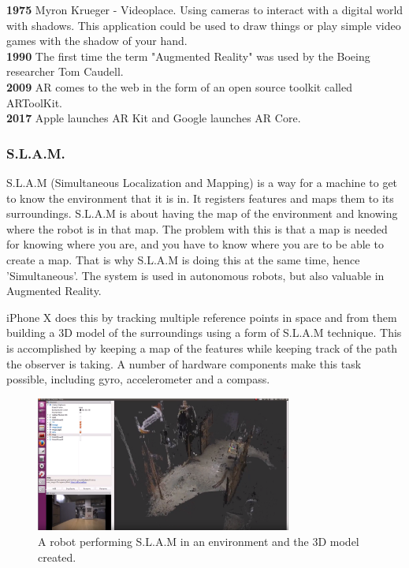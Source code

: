 \textbf{1975}
Myron Krueger - Videoplace. Using cameras to interact with a digital world with shadows.
This application could be used to draw things or play simple video games with the shadow of your hand.
\cite{videoplace}\\

\textbf{1990}
The first time the term "Augmented Reality" was used by the Boeing researcher Tom Caudell.\\

\textbf{2009}
AR comes to the web in the form of an open source toolkit called ARToolKit.\\

\textbf{2017}
Apple launches AR Kit and Google launches AR Core.\\

\subsubsection{S.L.A.M.}
S.L.A.M (Simultaneous Localization and Mapping) is a way for a machine to get to know the environment that it is in. It registers features and maps them to its surroundings. S.L.A.M is about having the map of the environment and knowing where the robot is in that map.
The problem with this is that a map is needed for knowing where you are, and you have to know where you are to be able to create a map. That is why S.L.A.M is doing this at the same time, hence 'Simultaneous'. The system is used in autonomous robots, but also valuable in Augmented Reality. \cite{slam}

iPhone X does this by tracking multiple reference points in space and from them building a 3D model of the surroundings using a form of S.L.A.M technique.
This is accomplished by keeping a map of the features while keeping track of the path the observer is taking. A number of 
hardware components make this task possible, including gyro, accelerometer and a compass. \cite{iphoneslam}

\begin{figure}[hbtp]
\begin{center}
\includegraphics[width = 0.75\textwidth]{./Images/slam-map.jpg} 
\caption{A robot performing S.L.A.M in an environment and the 3D model created.}
\end{center}
\end{figure}

